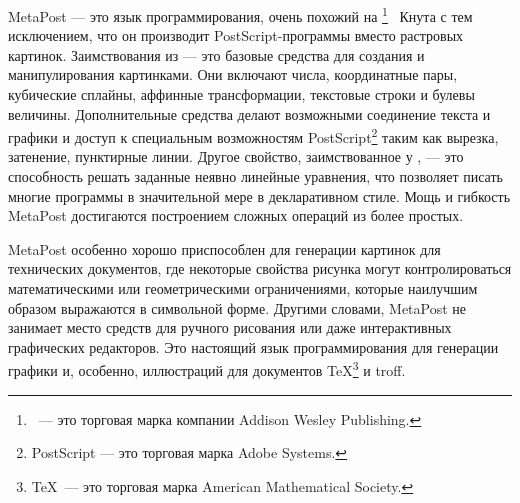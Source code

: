 \documentclass{article} %
\begin{document}
MetaPost --- это язык программирования, очень похожий на \MF\footnote{\MF\
--- это торговая марка компании Addison Wesley 
Publishing.}~\cite{kn:c} Кнута с тем исключением, что 
он производит PostScript-программы вместо растровых картинок. 
Заимствования из \MF --- это базовые средства для создания и 
манипулирования картинками.
Они включают числа, координатные пары, кубические сплайны, аффинные 
трансформации, текстовые строки и булевы величины.
Дополнительные средства делают возможными соединение текста и графики и 
доступ к специальным возможностям PostScript\footnote{PostScript --- 
это торговая марка Adobe Systems.}\index{PostScript} таким как 
вырезка, затенение, пунктирные линии.
Другое свойство, заимствованное у \MF, --- это способность решать 
заданные неявно линейные уравнения, что позволяет писать многие 
программы в значительной мере в декларативном стиле.
Мощь и гибкость MetaPost достигаются построением сложных операций 
из более простых. 

MetaPost особенно хорошо приспособлен для генерации картинок для 
технических документов, где некоторые свойства рисунка могут 
контролироваться математическими или геометрическими ограничениями, 
которые наилучшим образом выражаются в символьной форме.
Другими словами, MetaPost не занимает место средств для ручного 
рисования или даже интерактивных графических редакторов.
Это настоящий язык программирования для генерации графики и, особенно, 
иллюстраций для документов \TeX\footnote{\TeX\ --- это торговая марка American 
Mathematical Society.}\index{TeX?\TeX} и troff\index{troff}.
\end{document}
